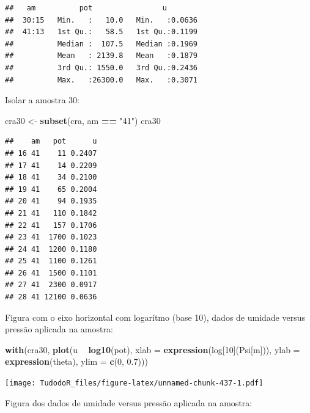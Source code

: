 \documentclass[
]{book}
\newenvironment{Shaded}{\begin{snugshade}}{\end{snugshade}}
\newcommand{\DataTypeTok}[1]{\textcolor[rgb]{0.13,0.29,0.53}{#1}}
\newcommand{\DecValTok}[1]{\textcolor[rgb]{0.00,0.00,0.81}{#1}}
\newcommand{\FloatTok}[1]{\textcolor[rgb]{0.00,0.00,0.81}{#1}}
\newcommand{\KeywordTok}[1]{\textcolor[rgb]{0.13,0.29,0.53}{\textbf{#1}}}
\newcommand{\NormalTok}[1]{#1}
\newcommand{\OperatorTok}[1]{\textcolor[rgb]{0.81,0.36,0.00}{\textbf{#1}}}
\newcommand{\StringTok}[1]{\textcolor[rgb]{0.31,0.60,0.02}{#1}}
\begin{document}
\begin{verbatim}
##   am          pot                u         
##  30:15   Min.   :   10.0   Min.   :0.0636  
##  41:13   1st Qu.:   58.5   1st Qu.:0.1199  
##          Median :  107.5   Median :0.1969  
##          Mean   : 2139.8   Mean   :0.1879  
##          3rd Qu.: 1550.0   3rd Qu.:0.2436  
##          Max.   :26300.0   Max.   :0.3071
\end{verbatim}

Isolar a amostra 30:

\begin{Shaded}
\begin{Highlighting}[]
\NormalTok{cra30 <-}\StringTok{ }\KeywordTok{subset}\NormalTok{(cra, am }\OperatorTok{==}\StringTok{ "41"}\NormalTok{)}
\NormalTok{cra30}
\end{Highlighting}
\end{Shaded}

\begin{verbatim}
##    am   pot      u
## 16 41    11 0.2407
## 17 41    14 0.2209
## 18 41    34 0.2100
## 19 41    65 0.2004
## 20 41    94 0.1935
## 21 41   110 0.1842
## 22 41   157 0.1706
## 23 41  1700 0.1023
## 24 41  1200 0.1180
## 25 41  1100 0.1261
## 26 41  1500 0.1101
## 27 41  2300 0.0917
## 28 41 12100 0.0636
\end{verbatim}

Figura com o eixo horizontal com logarítmo (base 10), dados de umidade versus pressão aplicada na amostra:

\begin{Shaded}
\begin{Highlighting}[]
\KeywordTok{with}\NormalTok{(cra30, }\KeywordTok{plot}\NormalTok{(u }\OperatorTok{~}\StringTok{ }\KeywordTok{log10}\NormalTok{(pot), }\DataTypeTok{xlab =} \KeywordTok{expression}\NormalTok{(log[}\DecValTok{10}\NormalTok{](Psi[m])), }\DataTypeTok{ylab =} \KeywordTok{expression}\NormalTok{(theta), }\DataTypeTok{ylim =} \KeywordTok{c}\NormalTok{(}\DecValTok{0}\NormalTok{, }\FloatTok{0.7}\NormalTok{)))}
\end{Highlighting}
\end{Shaded}

\texttt{[image: TudodoR\_files/figure-latex/unnamed-chunk-437-1.pdf]}

Figura dos dados de umidade versus pressão aplicada na amostra:
\end{document}

